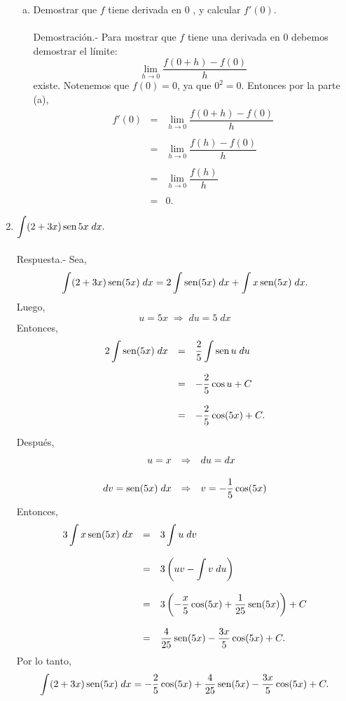 \begin{enumerate}[\bfseries 1.]
\begin{enumerate}[a)]
	\item Demostrar que $f$ tiene derivada en $0$ , y calcular $f'(0)$.\\\\
	    Demostración.-\; Para mostrar que $f$ tiene una derivada en $0$ debemos demostrar el límite:
	    $$\lim_{h\to 0}\dfrac{f(0+h)-f(0)}{h}$$
	    existe. Notenemos que $f(0)=0$, ya que $0^2=0$. Entonces por la parte (a),
	    $$
	    \begin{array}{rcl}
		f'(0) &=& \displaystyle\lim_{h\to 0}\dfrac{f(0+h)-f(0)}{h}\\\\
		      &=& \displaystyle\lim_{h\to 0}\dfrac{f(h)-f(0)}{h}\\\\
		      &=& \displaystyle\lim_{h\to 0}\dfrac{f(h)}{h}\\\\
		      &=& 0.
	    \end{array}
	    $$
	    \vspace{.5cm}

    \end{enumerate}

\item $\displaystyle\int (2+3x)\mathop{\mbox{\normalfont sen}}\nolimits 5x\; dx.$\\\\
	Respuesta.-\; Sea,
	$$\int (2+3x)\mathop{\mbox{\normalfont sen}}\nolimits(5x)\; dx = 2\int \mathop{\mbox{\normalfont sen}}\nolimits(5x)\; dx + \int x\mathop{\mbox{\normalfont sen}}\nolimits (5x)\; dx.$$
	Luego,
	$$u=5x\; \Rightarrow \; du=5\; dx$$
	Entonces,
	$$
	\begin{array}{rcl}
	    2\displaystyle\int \mathop{\mbox{\normalfont sen}}\nolimits(5x)\; dx &=& \dfrac{2}{5}\displaystyle\int \mathop{\mbox{\normalfont sen}}\nolimits u\; du\\\\
					     &=& -\dfrac{2}{5}\cos u + C\\\\
					     &=& -\dfrac{2}{5}\cos (5x) + C.
	 \end{array}
	$$

	Después,
	$$
	\begin{array}{rcl}
	    u=x &\Rightarrow& du=dx\\\\
	    dv = \mathop{\mbox{\normalfont sen}}\nolimits(5x)\; dx &\Rightarrow& v = -\dfrac{1}{5}\cos(5x)
	\end{array}
	$$
	Entonces,
	$$
	\begin{array}{rcl}
	    3\displaystyle\int x\mathop{\mbox{\normalfont sen}}\nolimits(5x)\; dx &=& 3 \displaystyle\int u \; dv\\\\
					      &=& 3\left(uv-\displaystyle\int v\; du\right)\\\\
					      &=& 3\left(-\dfrac{x}{5}\cos(5x)+\dfrac{1}{25}\mathop{\mbox{\normalfont sen}}\nolimits(5x)\right)+C\\\\
					      &=& \dfrac{4}{25}\mathop{\mbox{\normalfont sen}}\nolimits(5x)-\dfrac{3x}{5}\cos (5x) +C.
	\end{array}
	$$
	Por lo tanto,
	$$\int(2+3x)\mathop{\mbox{\normalfont sen}}\nolimits(5x)\; dx = -\dfrac{2}{5}\cos(5x) + \dfrac{4}{25}\mathop{\mbox{\normalfont sen}}\nolimits(5x)-\dfrac{3x}{5}\cos(5x) +C.$$\\


\end{enumerate}

